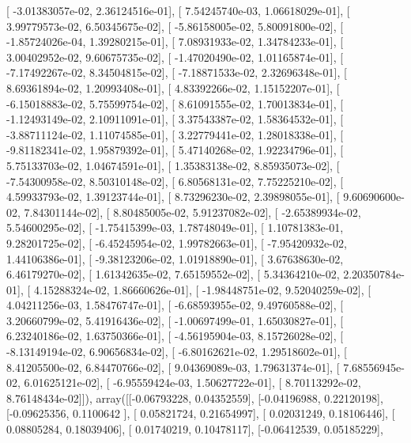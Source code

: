 \documentclass{article}
\begin{document}
       [ -3.01383057e-02,   2.36124516e-01],
       [  7.54245740e-03,   1.06618029e-01],
       [  3.99779573e-02,   6.50345675e-02],
       [ -5.86158005e-02,   5.80091800e-02],
       [ -1.85724026e-04,   1.39280215e-01],
       [  7.08931933e-02,   1.34784233e-01],
       [  3.00402952e-02,   9.60675735e-02],
       [ -1.47020490e-02,   1.01165874e-01],
       [ -7.17492267e-02,   8.34504815e-02],
       [ -7.18871533e-02,   2.32696348e-01],
       [  8.69361894e-02,   1.20993408e-01],
       [  4.83392266e-02,   1.15152207e-01],
       [ -6.15018883e-02,   5.75599754e-02],
       [  8.61091555e-02,   1.70013834e-01],
       [ -1.12493149e-02,   2.10911091e-01],
       [  3.37543387e-02,   1.58364532e-01],
       [ -3.88711124e-02,   1.11074585e-01],
       [  3.22779441e-02,   1.28018338e-01],
       [ -9.81182341e-02,   1.95879392e-01],
       [  5.47140268e-02,   1.92234796e-01],
       [  5.75133703e-02,   1.04674591e-01],
       [  1.35383138e-02,   8.85935073e-02],
       [ -7.54300958e-02,   8.50310148e-02],
       [  6.80568131e-02,   7.75225210e-02],
       [  4.59933793e-02,   1.39123744e-01],
       [  8.73296230e-02,   2.39898055e-01],
       [  9.60690600e-02,   7.84301144e-02],
       [  8.80485005e-02,   5.91237082e-02],
       [ -2.65389934e-02,   5.54600295e-02],
       [ -1.75415399e-03,   1.78748049e-01],
       [  1.10781383e-01,   9.28201725e-02],
       [ -6.45245954e-02,   1.99782663e-01],
       [ -7.95420932e-02,   1.44106386e-01],
       [ -9.38123206e-02,   1.01918890e-01],
       [  3.67638630e-02,   6.46179270e-02],
       [  1.61342635e-02,   7.65159552e-02],
       [  5.34364210e-02,   2.20350784e-01],
       [  4.15288324e-02,   1.86660626e-01],
       [ -1.98448751e-02,   9.52040259e-02],
       [  4.04211256e-03,   1.58476747e-01],
       [ -6.68593955e-02,   9.49760588e-02],
       [  3.20660799e-02,   5.41916436e-02],
       [ -1.00697499e-01,   1.65030827e-01],
       [  6.23240186e-02,   1.63750366e-01],
       [ -4.56195904e-03,   8.15726028e-02],
       [ -8.13149194e-02,   6.90656834e-02],
       [ -6.80162621e-02,   1.29518602e-01],
       [  8.41205500e-02,   6.84470766e-02],
       [  9.04369089e-03,   1.79631374e-01],
       [  7.68556945e-02,   6.01625121e-02],
       [ -6.95559424e-03,   1.50627722e-01],
       [  8.70113292e-02,   8.76148434e-02]]), array([[-0.06793228,  0.04352559],
       [-0.04196988,  0.22120198],
       [-0.09625356,  0.1100642 ],
       [ 0.05821724,  0.21654997],
       [ 0.02031249,  0.18106446],
       [ 0.08805284,  0.18039406],
       [ 0.01740219,  0.10478117],
       [-0.06412539,  0.05185229],
\end{document}
